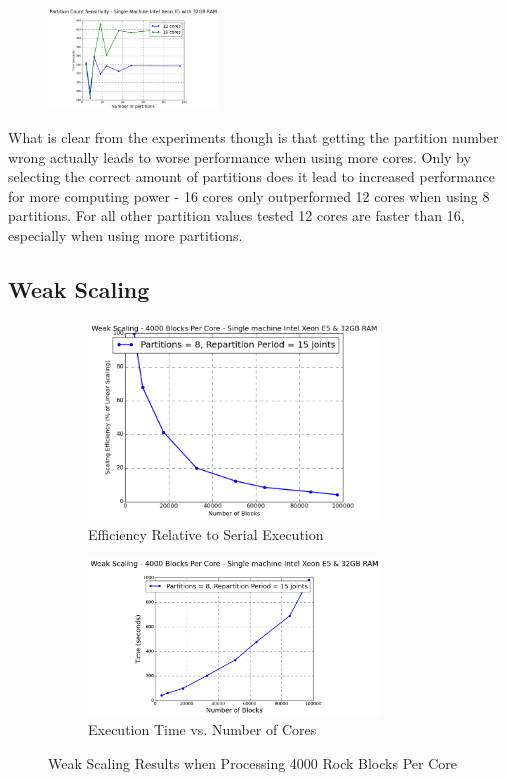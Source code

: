 \begin{figure}
  \centering
  \includegraphics[width=0.4\textwidth]{PartCount}
  \caption{}
  \label{fig:PartCount}
\end{figure}

What is clear from the experiments though is that getting the partition number wrong actually leads to worse performance when using more cores. Only by selecting the correct amount of partitions does it lead to increased performance for more computing power - 16 cores only outperformed 12 cores when using 8 partitions. For all other partition values tested 12 cores are faster than 16, especially when using more partitions.

\subsection{Weak Scaling}
\begin{figure}[t]
\centering
\begin{subfigure}{0.5\textwidth}
    \centering
    \includegraphics[width=0.85\textwidth]{weakScalingEfficiency.png}
    \caption{Efficiency Relative to Serial Execution}
\end{subfigure}%
\begin{subfigure}{0.5\textwidth}
    \centering
    \includegraphics[width=0.85\textwidth]{weakScalingTime.png}
    \caption{Execution Time vs. Number of Cores}
\end{subfigure}
\caption{Weak Scaling Results when Processing 4000 Rock Blocks Per Core}
\label{fig:weakScaling}
\end{figure}


